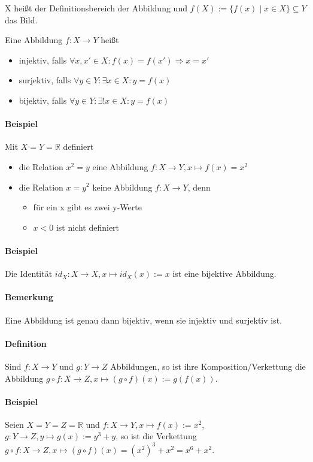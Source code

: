 \documentclass[12pt,a4paper,parskip=half-,DIV=15]{scrartcl}
\begin{document}
X heißt der Definitionsbereich der Abbildung und $f(X):=\{f(x)\mid x\in X \}\subseteq Y$ das Bild.

Eine Abbildung $f: X\to Y$ heißt
\begin{itemize}
\item injektiv, falls $\forall x,x'\in X:f(x) = f(x') \Rightarrow x=x'$
\item surjektiv, falls $\forall y\in Y:\exists x\in X: y = f(x)$
\item bijektiv, falls $\forall y\in Y:\exists !x\in X: y = f(x)$
\end{itemize}
\paragraph{Beispiel} Mit $X=Y=\mathbb{R}$ definiert
\begin{itemize}
\item die Relation $x^2 = y$ eine Abbildung $f:X\to Y, x\mapsto f(x)=x^2$
\item die Relation $x=y^2$ keine Abbildung $f:X\to Y$, denn
\begin{itemize}
\item für ein x gibt es zwei y-Werte
\item $x < 0$ ist nicht definiert
\end{itemize}
\end{itemize}

\paragraph{Beispiel} Die Identität $id_X :X\to X, x\mapsto id_X(x):= x$ ist eine bijektive Abbildung.
\paragraph{Bemerkung} Eine Abbildung ist genau dann bijektiv, wenn sie injektiv und surjektiv ist.
\paragraph{Definition} Sind $ f:X\to Y $ und $ g:Y\to Z$ Abbildungen, so ist ihre Komposition/Verkettung die Abbildung $ g\circ f:X\to Z, x\mapsto (g\circ f)(x):= g(f(x)) $.
\paragraph{Beispiel} Seien $ X = Y = Z = \mathbb{R} $ und $ f:X\to Y, x\mapsto f(x) :=x^2 $, $ g:Y\to Z, y\mapsto g(x):=y^3 + y $, so ist die Verkettung $ g\circ f: X\to Z, x\mapsto (g\circ f)(x) = (x^2)^3+x^2 = x^6 + x^2 $.
\end{document}
